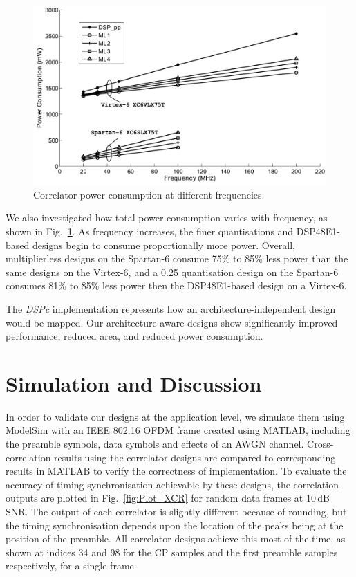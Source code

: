 \begin{figure}
	\centerline{\includegraphics [width=0.6\columnwidth] {figures/Plot_PWR.pdf} }
	\caption{Correlator power consumption at different frequencies.}
	\label{fig:Plot_PWR}
\end{figure}

We also investigated how total power consumption varies with frequency, as shown in Fig.~\ref{fig:Plot_PWR}.
As frequency increases, the finer quantisations and DSP48E1-based designs begin to consume proportionally more power.
Overall, multiplierless designs on the Spartan-6 consume 75\% to 85\% less power than the same designs on the Virtex-6, and a 0.25 quantisation design on the Spartan-6 consumes 81\% to 85\% less power then the DSP48E1-based design on a Virtex-6.

The \emph{DSPc} implementation represents how an architecture-independent design would be mapped. Our architecture-aware designs show significantly improved performance, reduced area, and reduced power consumption.

\section{Simulation and Discussion}
In order to validate our designs at the application level, we simulate them using ModelSim with an IEEE 802.16 OFDM frame created using MATLAB, including the preamble symbols, data symbols and effects of an AWGN channel.
Cross-correlation results using the correlator designs are compared to corresponding results in MATLAB to verify the correctness of implementation.
To evaluate the accuracy of timing synchronisation achievable by these designs, the correlation outputs are plotted in Fig.~\ref{fig:Plot_XCR} for random data frames at 10\,dB SNR.
The output of each correlator is slightly different because of rounding, but the timing synchronisation depends upon the location of the peaks being at the  position of the preamble.
All correlator designs achieve this most of the time, as shown at indices 34 and 98 for the CP samples and the first preamble samples respectively, for a single frame.

